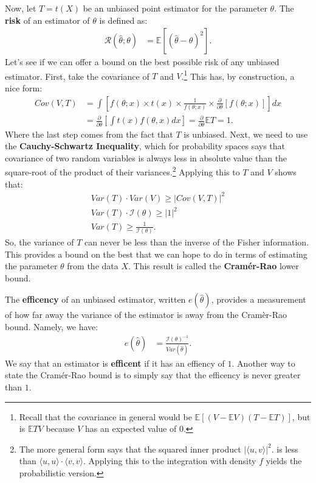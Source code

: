 \documentclass{tufte-handout}
\begin{document}
Now, let $T = t(X)$ be an unbiased point estimator for the parameter $\theta$.
The \textbf{risk} of an estimator of $\theta$ is defined as:
\begin{align*}
\mathcal{R}(\hat{\theta}; \theta) &= \mathbb{E}\left[ (\hat{\theta} - \theta)^2 \right].
\end{align*}
Let's see if we can offer a bound on the best possible risk of any
unbiased estimator. First, take the covariance of $T$ and $V$.\footnote{
  Recall that the covariance in general would be $\mathbb{E}[(V - \mathbb{E}V)(T - \mathbb{E}T)]$,
  but is $\mathbb{E}TV$ because $V$ has an expected value of $0$.
} This has, by construction, a nice form:
\begin{align*}
Cov(V, T) &= \int \left[ f(\theta; x) \times t(x) \times \frac{1}{f(\theta; x)} \times \frac{\partial}{\partial \theta} \left[ f(\theta; x) \right] \right] dx \\
&= \frac{\partial}{\partial \theta} \left[ \int t(x) f(\theta, x) dx \right] = \frac{\partial}{\partial \theta} \mathbb{E}T = 1.
\end{align*}
Where the last step comes from the fact that $T$ is unbiased.
Next, we need to use the \textbf{Cauchy-Schwartz Inequality}, which for
probability spaces says that covariance of two random variables is always
less in absolute value than the square-root of the product of their
variances.\footnote{
  The more general form says that the squared inner product $| \langle u, v\rangle |^2$.
  is less than $\langle u, u\rangle \cdot \langle v, v\rangle$. Applying this to
  the integration with density $f$ yields the probabilistic version.
} Applying this to $T$ and $V$ shows that:
\begin{align*}
Var(T) \cdot Var(V) \geq | Cov(V, T) |^2  \\
Var(T) \cdot \mathcal{I}(\theta) \geq | 1 |^2  \\
Var(T) \geq \frac{1}{\mathcal{I}(\theta)}.
\end{align*}
So, the variance of $T$ can never be less than the inverse of the Fisher
information. This provides a bound on the best that we can hope to do in terms
of estimating the parameter $\theta$ from the data $X$. This result is called the
\textbf{Cramér-Rao} lower bound.

The \textbf{efficency} of an unbiased estimator, written $e(\widehat{\theta})$, 
provides a measurement of how far away the variance of the estimator is 
away from the Cramèr-Rao bound. Namely, we have:
\begin{align*}
e(\widehat{\theta}) &= \frac{\mathcal{I}(\theta)^{-1}}{Var(\widehat{\theta})}.
\end{align*}
We say that an estimator is \textbf{efficent} if it has an effiency of $1$.
Another way to state the Cramér-Rao bound is to simply say that the efficency
is never greater than $1$.
\end{document}
